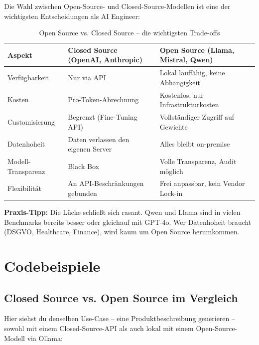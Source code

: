 Die Wahl zwischen Open-Source- und Closed-Source-Modellen ist eine der wichtigsten Entscheidungen als AI Engineer:

\begin{table}[H]
\centering
\begin{tabularx}{\linewidth}{lXX}
\toprule
\textbf{Aspekt} & \textbf{Closed Source (OpenAI, Anthropic)} & \textbf{Open Source (Llama, Mistral, Qwen)} \\
\midrule
Verfügbarkeit & Nur via API & Lokal lauffähig, keine Abhängigkeit \\
Kosten & Pro-Token-Abrechnung & Kostenlos, nur Infrastrukturkosten \\
Customisierung & Begrenzt (Fine-Tuning API) & Vollständiger Zugriff auf Gewichte \\
Datenhoheit & Daten verlassen den eigenen Server & Alles bleibt on-premise \\
Modell-Transparenz & Black Box & Volle Transparenz, Audit möglich \\
Flexibilität & An API-Beschränkungen gebunden & Frei anpassbar, kein Vendor Lock-in \\
\bottomrule
\end{tabularx}
\caption{Open Source vs. Closed Source -- die wichtigsten Trade-offs}
\label{tab:open-vs-closed}
\end{table}

\textbf{Praxis-Tipp:} Die Lücke schließt sich rasant. Qwen und Llama sind in vielen Benchmarks bereits besser oder gleichauf mit GPT-4o. Wer Datenhoheit braucht (DSGVO, Healthcare, Finance), wird kaum um Open Source herumkommen.

\section{Codebeispiele}

\subsection{Closed Source vs. Open Source im Vergleich}

Hier siehst du denselben Use-Case -- eine Produktbeschreibung generieren -- sowohl mit einem Closed-Source-API als auch lokal mit einem Open-Source-Modell via Ollama:

